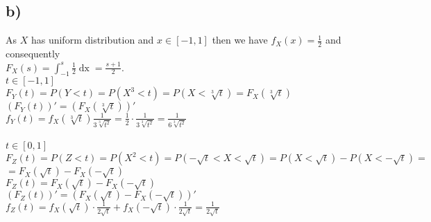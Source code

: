 \documentclass[11pt,wide]{article}
\begin{document}
\subsection{b)}
As $X$ has uniform distribution and $x \in [-1,1]$ then we have 
$f_X(x)=\frac{1}{2}$ 
and consequently \\
\(\displaystyle F_X(s) = \int_{-1}^s \frac{1}{2} \mathop{dx} = \frac{s+1}{2}\).\\
\( t\in [-1,1]\)\\
\(F_Y(t) = P(Y<t) = P(X^3<t) = P(X<\sqrt[3]{t}) = F_X(\sqrt[3]{t}) \) \\
\(\displaystyle (F_Y(t))' = (F_X(\sqrt[3]{t}))' \) \\
\(\displaystyle f_Y(t) = f_X(\sqrt[3]{t}) \frac{1}{3\sqrt[3]{t^2}} = \frac{1}{2} \cdot \frac{1}{3\sqrt[3]{t^2}} = 
\frac{1}{6\sqrt[3]{t^2}} \) \\ \\
\( t\in [0,1]\)\\
\(\displaystyle F_Z(t) = P(Z<t) = P(X^2<t) = P(-\sqrt{t}<X<\sqrt{t}) = P(X<\sqrt{t}) - P(X<-\sqrt{t}) = \) \\
\(\displaystyle = F_X(\sqrt{t}) - F_X(-\sqrt{t}) \) \\
\(\displaystyle F_Z(t) = F_X(\sqrt{t}) - F_X(-\sqrt{t}) \) \\
\(\displaystyle (F_Z(t))' = (F_X(\sqrt{t}) - F_X(-\sqrt{t}))' \) \\
\(\displaystyle f_Z(t) = f_X(\sqrt{t}) \cdot \frac{1}{2\sqrt{t}} + f_X(-\sqrt{t}) \cdot \frac{1}{2\sqrt{t}} = \frac{1}{2\sqrt{t}} \)
\end{document}
